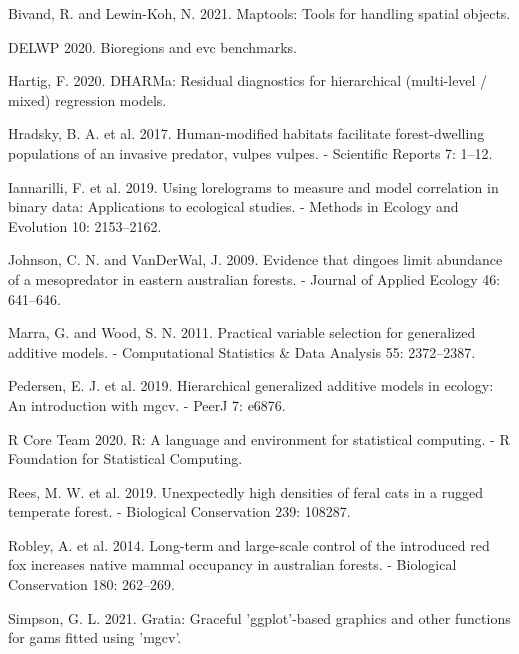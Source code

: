 \documentclass[]{elsarticle} %
\begin{document}
\hypertarget{refs}{}
\leavevmode\hypertarget{ref-maptools}{}%
Bivand, R. and Lewin-Koh, N. 2021. Maptools: Tools for handling spatial objects.

\leavevmode\hypertarget{ref-delwp2020}{}%
DELWP 2020. Bioregions and evc benchmarks.

\leavevmode\hypertarget{ref-DHARMa}{}%
Hartig, F. 2020. DHARMa: Residual diagnostics for hierarchical (multi-level / mixed) regression models.

\leavevmode\hypertarget{ref-hradsky2017human}{}%
Hradsky, B. A. et al. 2017. Human-modified habitats facilitate forest-dwelling populations of an invasive predator, vulpes vulpes. - Scientific Reports 7: 1--12.

\leavevmode\hypertarget{ref-https:ux2fux2fdoi.orgux2f10.1111ux2f2041-210X.13308}{}%
Iannarilli, F. et al. 2019. Using lorelograms to measure and model correlation in binary data: Applications to ecological studies. - Methods in Ecology and Evolution 10: 2153--2162.

\leavevmode\hypertarget{ref-https:ux2fux2fdoi.orgux2f10.1111ux2fj.1365-2664.2009.01650.x}{}%
Johnson, C. N. and VanDerWal, J. 2009. Evidence that dingoes limit abundance of a mesopredator in eastern australian forests. - Journal of Applied Ecology 46: 641--646.

\leavevmode\hypertarget{ref-MARRA20112372}{}%
Marra, G. and Wood, S. N. 2011. Practical variable selection for generalized additive models. - Computational Statistics \& Data Analysis 55: 2372--2387.

\leavevmode\hypertarget{ref-pedersen2019hierarchical}{}%
Pedersen, E. J. et al. 2019. Hierarchical generalized additive models in ecology: An introduction with mgcv. - PeerJ 7: e6876.

\leavevmode\hypertarget{ref-R}{}%
R Core Team 2020. R: A language and environment for statistical computing. - R Foundation for Statistical Computing.

\leavevmode\hypertarget{ref-REES2019108287}{}%
Rees, M. W. et al. 2019. Unexpectedly high densities of feral cats in a rugged temperate forest. - Biological Conservation 239: 108287.

\leavevmode\hypertarget{ref-ROBLEY2014262}{}%
Robley, A. et al. 2014. Long-term and large-scale control of the introduced red fox increases native mammal occupancy in australian forests. - Biological Conservation 180: 262--269.

\leavevmode\hypertarget{ref-gratia}{}%
Simpson, G. L. 2021. Gratia: Graceful 'ggplot'-based graphics and other functions for gams fitted using 'mgcv'.
\end{document}
